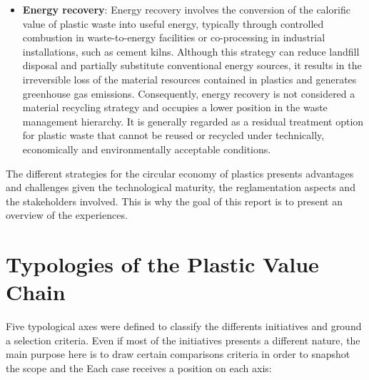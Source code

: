 \documentclass[
  12pt,
  oneside]{book}
\begin{document}
\begin{itemize}
  conversion of plastic waste into basic chemical substances or
  hydrocarbon feedstocks that can be reintegrated into industrial
  production processes. Technologies such as pyrolysis, gasification and
  hydrothermal conversion transform polymers into products such as
  pyrolysis oils, synthesis gas or other chemical fractions. Unlike
  selective depolymerisation, feedstock recycling does not necessarily
  seek to recover the original monomers of a specific polymer. It offers
  potential opportunities for the treatment of mixed or contaminated
  plastic waste and the substitution of fossil-based industrial
  feedstocks. Its contribution to material circularity depends, however,
  on the extent to which the recovered substances are used to
  manufacture new materials rather than fuels.
\item
  \textbf{Energy recovery}: Energy recovery involves the conversion of
  the calorific value of plastic waste into useful energy, typically
  through controlled combustion in waste-to-energy facilities or
  co-processing in industrial installations, such as cement kilns.
  Although this strategy can reduce landfill disposal and partially
  substitute conventional energy sources, it results in the irreversible
  loss of the material resources contained in plastics and generates
  greenhouse gas emissions. Consequently, energy recovery is not
  considered a material recycling strategy and occupies a lower position
  in the waste management hierarchy. It is generally regarded as a
  residual treatment option for plastic waste that cannot be reused or
  recycled under technically, economically and environmentally
  acceptable conditions.
\end{itemize}

The different strategies for the circular economy of plastics presents
advantages and challenges given the technological maturity, the
reglamentation aspects and the stakeholders involved. This is why the
goal of this report is to present an overview of the experiences.

\section{Typologies of the Plastic Value
Chain}\label{typologies-of-the-plastic-value-chain}

Five typological axes were defined to classify the differents
initiatives and ground a selection criteria. Even if most of the
initiatives presents a different nature, the main purpose here is to
draw certain comparisons criteria in order to snapshot the scope and the
Each case receives a position on each axis:
\end{document}
